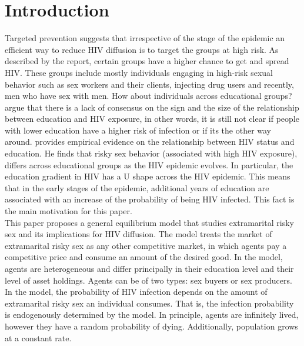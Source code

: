 \section{Introduction}\label{sec1}

Targeted prevention suggests that irrespective of the stage of the epidemic an efficient way to reduce HIV diffusion is to target the groups at high risk. As described by the \cite{report2} report, certain groups have a higher chance to get and spread HIV. These groups include mostly individuals engaging in high-risk sexual behavior such as sex workers and their clients, injecting drug users and recently, men who have sex with men. How about individuals across educational groups?\\

\cite{beegle} argue that there is a lack of consensus on the sign and the size of the relationship between education and HIV exposure, in other words, it is still not clear if people with lower education have a higher risk of infection or if its the other way around. \cite{raul} provides empirical evidence on the relationship between HIV status and education. He finds that risky sex behavior (associated with high HIV exposure), differs across educational groups as the HIV epidemic evolves. In particular, the education gradient in HIV has a U shape across the HIV epidemic. This means that in the early stages of the epidemic, additional years of education are associated with an increase of the probability of being HIV infected. This fact is the main motivation for this paper.   \\

This paper proposes a general equilibrium model that studies extramarital risky sex and its implications for HIV diffusion. The model treats the market of extramarital risky sex as any other competitive market, in which agents pay a competitive price and consume an amount of the desired good. In the model, agents are heterogeneous and differ principally in their education level and their level of asset holdings. Agents can be of two types: sex buyers or sex producers. In the model, the probability of HIV infection depends on the amount of extramarital risky sex an individual consumes. That is, the infection probability is endogenously determined by the model. In principle, agents are infinitely lived, however they have a random  probability of dying. Additionally, population grows at a constant rate.\\
